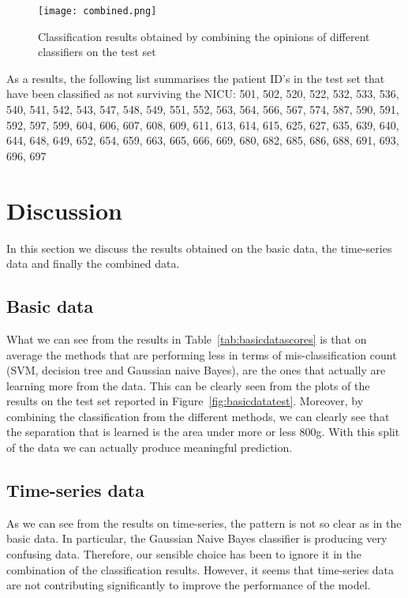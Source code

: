 \documentclass[a4paper,11pt]{article}
\begin{document}
\begin{figure}[H]
    \centering
    \texttt{[image: combined.png]}
    \caption{Classification results obtained by combining the opinions of different classifiers on the test set}
    \label{fig:comb}
\end{figure}

As a results, the following list summarises the patient ID's in the test set that have been classified as not surviving the NICU: 501, 502, 520, 522, 532, 533, 536, 540, 541, 542, 543, 547, 548, 549, 551, 552, 563, 564, 566, 567, 574, 587, 590, 591, 592, 597, 599, 604, 606, 607, 608, 609, 611, 613, 614, 615, 625, 627, 635, 639, 640, 644, 648, 649, 652, 654, 659, 663, 665, 666, 669, 680, 682, 685, 686, 688, 691, 693, 696, 697


\section{Discussion}\label{sec:discussion}
In this section we discuss the results obtained on the basic data, the time-series data and finally the combined data.

\subsection*{Basic data}\label{sec:dis_basic_data}
What we can see from the results in Table~\ref{tab:basicdatascores} is that on average the methods that are performing less in terms of mis-classification count (SVM, decision tree and Gaussian naive Bayes), are the ones that actually are learning more from the data. This can be clearly seen from the plots of the results on the test set reported in Figure~\ref{fig:basicdatatest}. Moreover, by combining the classification from the different methods, we can clearly see that the separation that is learned is the area under more or less 800g. With this split of the data we can actually produce meaningful prediction.

\subsection*{Time-series data}\label{sec:dis_ts_data}
As we can see from the results on time-series, the pattern is not so clear as in the basic data. In particular, the Gaussian Naive Bayes classifier is producing very confusing data. Therefore, our sensible choice has been to ignore it in the combination of the classification results. However, it seems that time-series data are not contributing significantly to improve the performance of the model.
\end{document}
